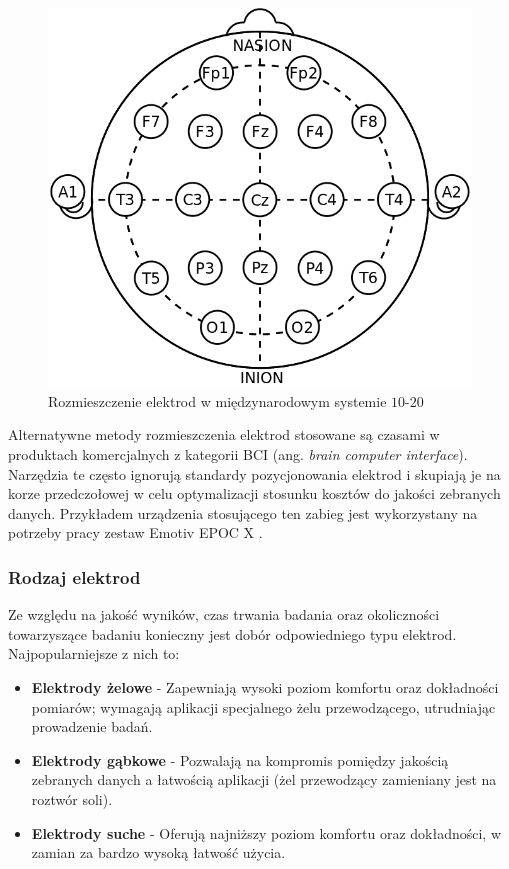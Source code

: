 \documentclass{./assets/wfis}
\begin{document}
\begin{figure}[h]
    \centering
    \includegraphics[width=0.5\columnwidth]{thesis/assets/10-20_system_electrodes.png}
    \caption[Rozmieszczenie elektrod w międzynarodowym systemie $10$-$20$]{Rozmieszczenie elektrod w międzynarodowym systemie $10$-$20$\footnotemark}
    \label{fig:10-20-system}
\end{figure}

Alternatywne metody rozmieszczenia elektrod stosowane są czasami w produktach komercjalnych z kategorii BCI (ang. \textit{brain computer interface}). Narzędzia te często ignorują standardy pozycjonowania elektrod i skupiają je na korze przedczołowej w celu optymalizacji stosunku kosztów do jakości zebranych danych. Przykładem urządzenia stosującego ten zabieg jest wykorzystany na potrzeby pracy zestaw Emotiv EPOC X \cite{emotiv_inc_epoc_nodate}. 


\subsubsection{Rodzaj elektrod}
Ze względu na jakość wyników, czas trwania badania oraz okoliczności towarzyszące badaniu konieczny jest dobór odpowiedniego typu elektrod. Najpopularniejsze z nich to:

\begin{itemize}
    \item \textbf{Elektrody żelowe} - Zapewniają wysoki poziom komfortu oraz dokładności pomiarów; wymagają aplikacji specjalnego żelu przewodzącego, utrudniając prowadzenie badań.
    \item \textbf{Elektrody gąbkowe} - Pozwalają na kompromis pomiędzy jakością zebranych danych a łatwością aplikacji (żel przewodzący zamieniany jest na roztwór soli).
    \item \textbf{Elektrody suche} - Oferują najniższy poziom komfortu oraz dokładności, w zamian za bardzo wysoką łatwość użycia.
\end{itemize}
\end{document}
